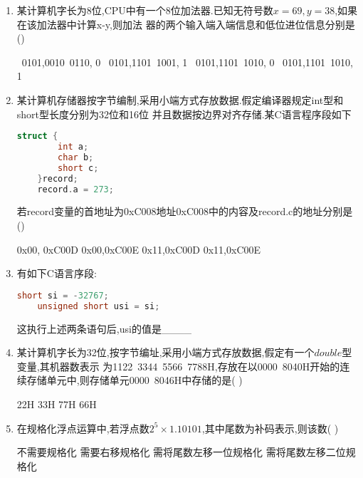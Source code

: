 \documentclass[12pt, a4paper, oneside, UTF8]{ctexbook}
\begin{document}
\begin{enumerate}
    \item \bl 某计算机字长为8位,CPU中有一个8位加法器.已知无符号数$x=69,y=38$,如果在该加法器中计算x-y,则加法
    器的两个输入端入端信息和低位进位信息分别是() 
    \begin{choices}[2]
        \ 0101,0010\ 0110, 0
        \ 0101,1101\ 1001, 1
        \ 0101,1101\ 1010, 0
        \ 0101,1101\ 1010, 1
    \end{choices}


    \item \bt 某计算机存储器按字节编制,采用小端方式存放数据.假定编译器规定int型和short型长度分别为32位和16位
    并且数据按边界对齐存储.某C语言程序段如下
    \begin{center}
    \begin{lstlisting}[language=C]
    struct {
        int a;
        char b;
        short c;
    }record;
    record.a = 273;
    \end{lstlisting}
    \end{center}
    若record变量的首地址为0xC008地址0xC008中的内容及record.c的地址分别是()
    \begin{choices}
        \task 0x00, 0xC00D
        \task 0x00,0xC00E
        \task 0x11,0xC00D
        \task 0x11,0xC00E
    \end{choices}


    \item \bt 有如下C语言序段:
    \begin{lstlisting}[language=C]
    short si = -32767;
    unsigned short usi = si;
    \end{lstlisting}
    这执行上述两条语句后,usi的值是\_\_\_\_ 

    \item 某计算机字长为32位,按字节编址,采用小端方式存放数据,假定有一个$double$型变量,其机器数表示
    为1122\ 3344\ 5566\ 7788H,存放在以0000\ 8040H开始的连续存储单元中,则存储单元0000\ 8046H中存储的是(   )
    \begin{choices}
        \task 22H 
        \task 33H 
        \task 77H 
        \task 66H 
    \end{choices}
    

    \item 在规格化浮点运算中,若浮点数$2^5\times1.10101$,其中尾数为补码表示,则该数(   ) 
    \begin{choices}[2]
        \task 不需要规格化
        \task 需要右移规格化
        \task 需将尾数左移一位规格化
        \task 需将尾数左移二位规格化
    \end{choices}



\end{enumerate}
\end{document}
